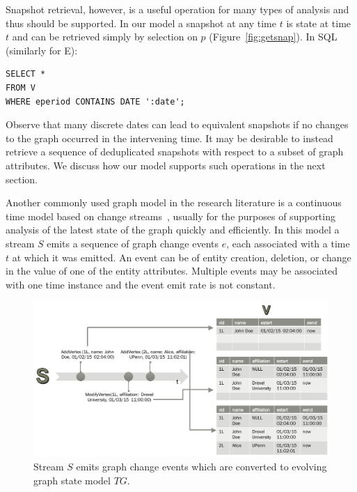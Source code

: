 Snapshot retrieval, however, is a useful operation for many types of
analysis and thus should be supported.  In our model a snapshot at any
time $t$ is state at time $t$ and can be retrieved simply by selection
on $p$ (Figure~\ref{fig:getsnap}). In SQL (similarly for E):

\begin{small}
\begin{verbatim}
SELECT *
FROM V
WHERE eperiod CONTAINS DATE ':date';
\end{verbatim}
\end{small}

Observe that many discrete dates can lead to equivalent snapshots if
no changes to the graph occurred in the intervening time.  It may be
desirable to instead retrieve a sequence of deduplicated snapshots
with respect to a subset of graph attributes.  We discuss how our
model supports such operations in the next section.

Another commonly used graph model in the research literature is a
continuous time model based on change
streams~\cite{Cheng2012,Ediger2012}, usually for the purposes of
supporting analysis of the latest state of the graph quickly and
efficiently.  In this model a stream $S$ emits a sequence of graph
change events $e$, each associated with a time $t$ at which it was
emitted.  An event can be of entity creation, deletion, or change in
the value of one of the entity attributes.  Multiple events may be
associated with one time instance and the event emit rate is not
constant.

\begin{figure}[t]
\centering
\includegraphics[width=6in]{figs/stream_to_state.pdf}
\caption{Stream $S$ emits graph change events which are converted to
  evolving graph state model $TG$.}
\label{fig:streamtotg}
\end{figure}

